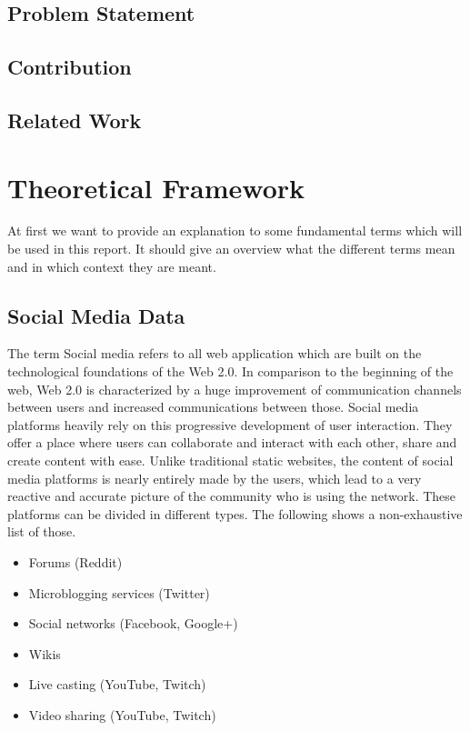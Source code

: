 \documentclass[11pt,titlepage,oneside,openany]{book}
\begin{document}
 
\section{Problem Statement}
 

\section{Contribution}


\section{Related Work}



\chapter{Theoretical Framework}
\label{cha:theory}

At first we want to provide an explanation to some fundamental terms which will be used in this report. It should give an overview what the different terms mean and in which context they are meant.

\section{Social Media Data}
\label{sec:socmedia}

The term Social media refers to all web application which are built on the technological foundations of the Web 2.0. In comparison to the beginning of the web, Web 2.0 is characterized by a huge improvement of communication channels between users and increased communications between those. Social media platforms heavily rely on this progressive development of user interaction. They offer a place where users can collaborate and interact with each other, share and create content with ease. Unlike traditional static websites, the content of social media platforms is nearly entirely made by the users, which lead to a very reactive and accurate picture of the community who is using the network. These platforms can be divided in different types. The following shows a non-exhaustive list of those. \cite{Rouse2016-09-15}\cite{Rouse2015-01-15}

\begin{itemize}
	\item Forums (Reddit)
	\item Microblogging services (Twitter)
	\item Social networks (Facebook, Google+)
	\item Wikis
	\item Live casting (YouTube, Twitch)\\
	\item Video sharing (YouTube, Twitch)
\end{itemize}
\end{document}
